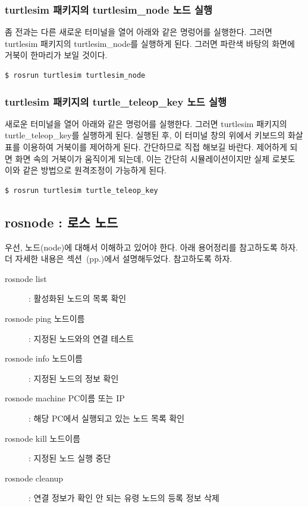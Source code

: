 \subsubsection{turtlesim 패키지의 turtlesim\_node 노드 실행}

좀 전과는 다른 새로운 터미널을 열어 아래와 같은 명렁어를 실행한다. 그러면 turtlesim 패키지의 turtlesim\_node를 실행하게 된다. 그러면 파란색 바탕의 화면에 거북이 한마리가 보일 것이다.

\begin{lstlisting}[language=bash]
$ rosrun turtlesim turtlesim_node 
\end{lstlisting}

\subsubsection{turtlesim 패키지의 turtle\_teleop\_key 노드 실행}

새로운 터미널을 열어 아래와 같은 명렁어를 실행한다. 그러면 turtlesim 패키지의 turtle\_teleop\_key를 실행하게 된다. 실행된 후, 이 터미널 창의 위에서 키보드의 화살표를 이용하여 거북이를 제어하게 된다. 간단하므로 직접 해보길 바란다. 제어하게 되면 화면 속의 거북이가 움직이게 되는데, 이는 간단히 시뮬레이션이지만 실제 로봇도 이와 같은 방법으로 원격조정이 가능하게 된다.

\begin{lstlisting}[language=bash]
$ rosrun turtlesim turtle_teleop_key
\end{lstlisting}

\subsection{rosnode : 로스 노드}

우선, 노드(node)에 대해서 이해하고 있어야 한다. 아래 용어정리를 참고하도록 하자. 더 자세한 내용은 섹션~(pp.\pageref{def:RosNode})에서 설명해두었다. 참고하도록 하자.

\vspace{\baselineskip}
\noindent
\begin{description}
\item[rosnode list] : 활성화된 노드의 목록 확인
\item[rosnode ping 노드이름] : 지정된 노드와의 연결 테스트
\item[rosnode info 노드이름] : 지정된 노드의 정보 확인
\item[rosnode machine PC이름 또는 IP] : 해당 PC에서 실행되고 있는 노드 목록 확인
\item[rosnode kill 노드이름] : 지정된 노드 실행 중단
\item[rosnode cleanup] : 연결 정보가 확인 안 되는 유령 노드의 등록 정보 삭제
\end{description}

